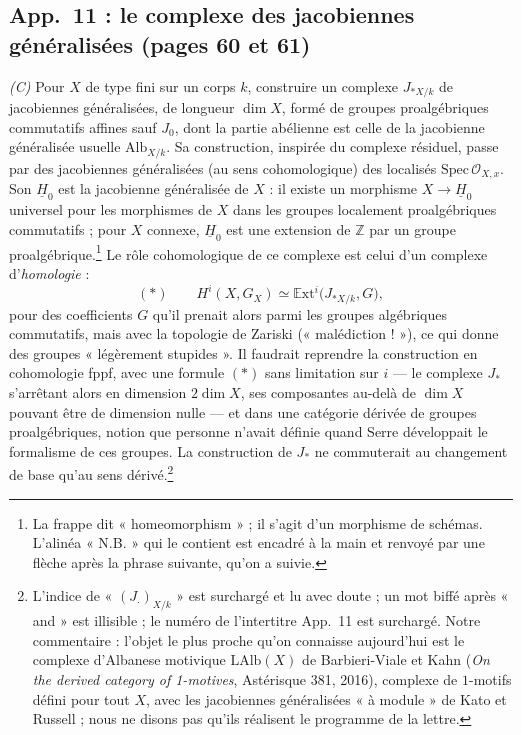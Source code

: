 \documentclass[11pt,a4paper]{article}
\begin{document}
\subsection*{App.~11 : le complexe des jacobiennes généralisées (pages 60 et 61)}

\emph{(C)} Pour $X$ de type fini sur un corps $k$, construire un complexe
$J_{*X/k}$ de jacobiennes généralisées, de longueur $\dim X$, formé de
groupes proalgébriques commutatifs affines sauf $J_0$, dont la partie
abélienne est celle de la jacobienne généralisée usuelle $\mathrm{Alb}_{X/k}$.
Sa construction, inspirée du complexe résiduel, passe par des jacobiennes
généralisées (au sens cohomologique) des localisés
$\mathrm{Spec}\,\mathcal{O}_{X,x}$. Son $\underline{H}_0$ est la jacobienne
généralisée de $X$ : il existe un morphisme $X \to \underline{H}_0$
universel pour les morphismes de $X$ dans les groupes localement
proalgébriques commutatifs ; pour $X$ connexe, $\underline{H}_0$ est une
extension de $\mathbb{Z}$ par un groupe proalgébrique.\footnote{La frappe
dit « homeomorphism » ; il s'agit d'un morphisme de schémas. L'alinéa
« N.B. » qui le contient est encadré à la main et renvoyé par une flèche
après la phrase suivante, qu'on a suivie.} Le rôle cohomologique de ce
complexe est celui d'un complexe d'\emph{homologie} :
\[
(*) \qquad H^i(X,G_X) \simeq \mathbb{E}\mathrm{xt}^i\bigl(J_{*X/k},G\bigr),
\]
pour des coefficients $G$ qu'il prenait alors parmi les groupes algébriques
commutatifs, mais avec la topologie de Zariski (« malédiction ! »), ce qui
donne des groupes « légèrement stupides ». Il faudrait reprendre la
construction en cohomologie fppf, avec une formule $(*)$ sans limitation sur
$i$ --- le complexe $J_*$ s'arrêtant alors en dimension $2\dim X$, ses
composantes au-delà de $\dim X$ pouvant être de dimension nulle --- et dans
une catégorie dérivée de groupes proalgébriques, notion que personne n'avait
définie quand Serre développait le formalisme de ces groupes. La
construction de $J_*$ ne commuterait au changement de base qu'au sens
dérivé.\footnote{L'indice de « $(J_\cdot)_{X/k}$ » est surchargé et lu avec
doute ; un mot biffé après « and » est illisible ; le numéro de l'intertitre
App.~11 est surchargé. Notre commentaire : l'objet le plus proche qu'on
connaisse aujourd'hui est le complexe d'Albanese motivique $\mathrm{LAlb}(X)$
de Barbieri-Viale et Kahn (\emph{On the derived category of 1-motives},
Astérisque 381, 2016), complexe de $1$-motifs défini pour tout $X$, avec les
jacobiennes généralisées « à module » de Kato et Russell ; nous ne disons
pas qu'ils réalisent le programme de la lettre.}
\end{document}
